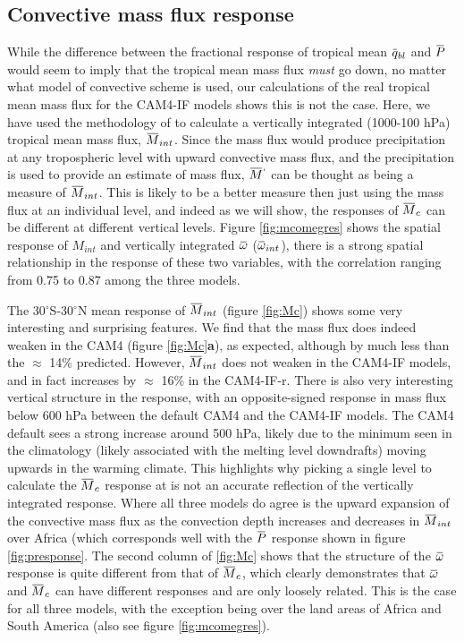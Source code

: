 \documentclass[letterpaper,12pt,titlepage,oneside,final]{book}
\newcommand{\overbar}[1]{\mkern 1.5mu\overline{\mkern-1.5mu#1\mkern-1.5mu}\mkern 1.5mu}
\begin{document}
\subsection{Convective mass flux response}
While the difference between the fractional response of tropical mean $\overbar{q}_{bl}$ and $\overbar{P}$ would seem to imply that the tropical mean mass flux \textit{must} go down, no matter what model of convective scheme is used, our calculations of the real tropical mean mass flux for the CAM4-IF models shows this is not the case. Here, we have used the methodology of \citep{chadwick_spatial_2012} to calculate a vertically integrated (1000-100 hPa) tropical mean mass flux, $\overbar{M}_{int}$. Since the mass flux would produce precipitation at any tropospheric level with upward convective mass flux, and the precipitation is used to provide an estimate of mass flux, $\overbar{M}^{`}$ can be thought as being a measure of $\overbar{M}_{int}$. This is likely to be a better measure then just using the mass flux at an individual level, and indeed as we will show, the responses of $\overbar{M}_{c}$ can be different at different vertical levels. Figure \ref{fig:mcomegres} shows the spatial response of $M_{int}$ and vertically integrated $\overbar{\omega}$ ($\overbar{\omega}_{int}$), there is a strong spatial relationship in the response of these two variables, with the correlation ranging from 0.75 to 0.87 among the three models.

The 30$^{\circ}$S-30$^{\circ}$N mean response of $\overbar{M}_{int}$ (figure \ref{fig:Mc}) shows some very interesting and surprising features. We find that the mass flux does indeed weaken in the CAM4 (figure \ref{fig:Mc}\textbf{a}), as expected, although by much less than the $\approx$ 14\% predicted. However, $\overbar{M}_{int}$ does not weaken in the CAM4-IF models, and in fact increases by $\approx$ 16\% in the CAM4-IF-r. There is also very interesting vertical structure in the response, with an opposite-signed response in mass flux below 600 hPa between the default CAM4 and the CAM4-IF models. The CAM4 default sees a strong increase around 500 hPa, likely due to the minimum seen in the climatology (likely associated with the melting level downdrafts) moving upwards in the warming climate. This highlights why picking a single level to calculate the $\overbar{M}_{c}$ response at is not an accurate reflection of the vertically integrated response. Where all three models do agree is the upward expansion of the convective mass flux as the convection depth increases and decreases in $\overbar{M}_{int}$ over Africa (which corresponds well with the $\overbar{P}$ response shown in figure \ref{fig:presponse}. The second column of \ref{fig:Mc} shows that the structure of the $\overbar{\omega}$ response is quite different from that of $\overbar{M}_{c}$, which clearly demonstrates that $\overbar{\omega}$ and $\overbar{M}_{c}$ can have different responses and are only loosely related. This is the case for all three models, with the exception being over the land areas of Africa and South America (also see figure \ref{fig:mcomegres}).
\end{document}
